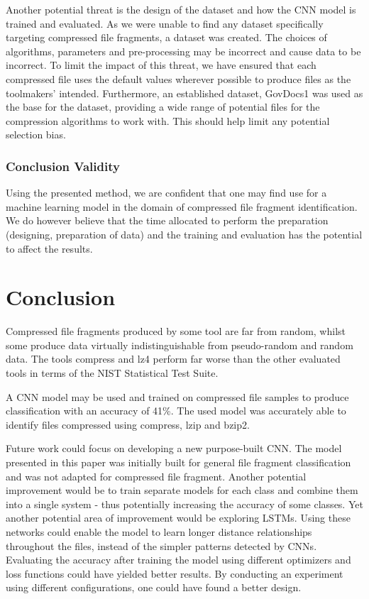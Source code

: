 \documentclass[conference]{IEEEtran}
\begin{document}
Another potential threat is the design of the dataset and how the CNN model is trained and evaluated. As we were unable to find any dataset specifically targeting compressed file fragments, a dataset was created. The choices of algorithms, parameters and pre-processing may be incorrect and cause data to be incorrect. To limit the impact of this threat, we have ensured that each compressed file uses the default values wherever possible to produce files as the toolmakers' intended. Furthermore, an established dataset, GovDocs1 was used as the base for the dataset, providing a wide range of potential files for the compression algorithms to work with. This should help limit any potential selection bias.

\subsubsection{Conclusion Validity}
\label{section:conclusion-validity}

Using the presented method, we are confident that one may find use for a machine learning model in the domain of compressed file fragment identification. We do however believe that the time allocated to perform the preparation (designing, preparation of data) and the training and evaluation has the potential to affect the results.

\newpage
\section{Conclusion}

Compressed file fragments produced by some tool are far from random, whilst some produce data virtually indistinguishable from pseudo-random and random data. The tools compress and lz4 perform far worse than the other evaluated tools in terms of the NIST Statistical Test Suite.

A CNN model may be used and trained on compressed file samples to produce classification with an accuracy of 41\%. The used model was accurately able to identify files compressed using compress, lzip and bzip2.

Future work could focus on developing a new purpose-built CNN. The model presented in this paper was initially built for general file fragment classification and was not adapted for compressed file fragment\cite{chen2018}. Another potential improvement would be to train separate models for each class and combine them into a single system - thus potentially increasing the accuracy of some classes. Yet another potential area of improvement would be exploring LSTMs. Using these networks could enable the model to learn longer distance relationships throughout the files, instead of the simpler patterns detected by CNNs\cite{LE2018S118}. Evaluating the accuracy after training the model using different optimizers and loss functions could have yielded better results. By conducting an experiment using different configurations, one could have found a better design.
\end{document}
